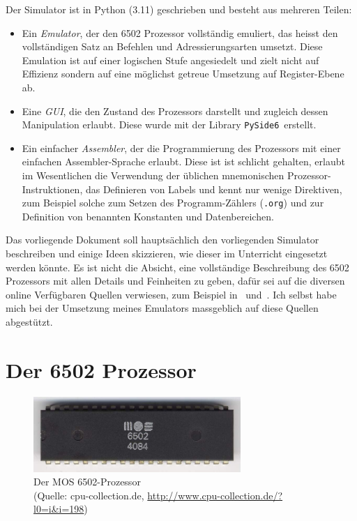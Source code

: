 \documentclass[11pt]{scrartcl}
\newcommand{\pyside}{\lstinline!PySide6!}
\begin{document}
Der Simulator ist in Python (3.11) geschrieben und besteht aus
mehreren Teilen:
\begin{itemize}
\item Ein \emph{Emulator}, der den 6502 Prozessor vollständig
  emuliert, das heisst den vollstän\-digen Satz an Befehlen und
  Adressierungsarten umsetzt. Diese Emulation ist auf einer logischen
  Stufe angesiedelt und zielt nicht auf Effizienz sondern auf eine
  möglichst getreue Umsetzung auf Register-Ebene ab.
\item Eine \emph{GUI}, die den Zustand des Prozessors darstellt und
  zugleich dessen Manipulation erlaubt.  Diese wurde mit der Library
  \pyside\ erstellt.
\item Ein einfacher \emph{Assembler}, der die Programmierung des
  Prozessors mit einer einfachen Assembler-Sprache erlaubt. Diese ist
  ist schlicht gehalten, erlaubt im Wesentlichen die Verwendung der
  üblichen mnemonischen Prozessor-Instruktionen, das Definieren von
  Labels und kennt nur wenige Direktiven, zum Beispiel solche zum
  Setzen des Programm-Zählers (\lstinline!.org!) und zur Definition
  von benannten Konstanten und Datenbereichen.
\end{itemize}

Das vorliegende Dokument soll hauptsächlich den vorliegenden Simulator
beschreiben und einige Ideen skizzieren, wie dieser im Unterricht
eingesetzt werden könnte. Es ist nicht die Absicht, eine vollständige
Beschreibung des 6502 Prozessors mit allen Details und Feinheiten zu
geben, dafür sei auf die diversen online Verfügbaren Quellen
verwiesen, zum Beispiel in~\cite{6502org_reference}
und~\cite{masswerk_6502instructions}. Ich selbst habe mich bei der
Umsetzung meines Emulators massgeblich auf diese Quellen abgestützt.

\newpage
\section{Der 6502 Prozessor}
\begin{figure}
  \centering \includegraphics[width=0.7\textwidth]{6502processor.jpeg}
  \caption{Der MOS 6502-Prozessor \\ (Quelle: cpu-collection.de,
    {\small \protect\url{http://www.cpu-collection.de/?l0=i&i=198})}}
\end{figure}
\end{document}
